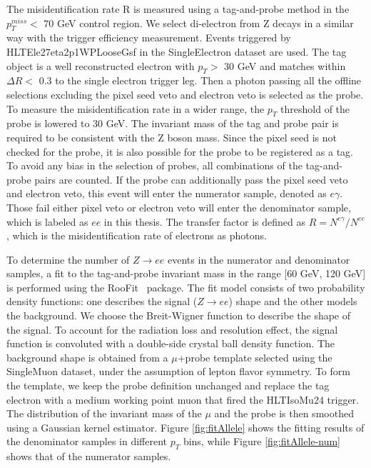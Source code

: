 \documentclass[thesis.tex]{subfiles}
\renewcommand\_{\textunderscore\allowbreak}
\begin{document}
The misidentification rate R is measured using a tag-and-probe method in the $p_T^{miss} < $ 70 GeV control region. We select di-electron from Z decays in a similar way with the trigger efficiency measurement. Events triggered by HLT\_Ele27\_eta2p1\_WPLoose\_Gsf in the SingleElectron dataset are used. The tag object is a well reconstructed electron with $p_T >$ 30 GeV and matches within $\Delta R <$ 0.3 to the single electron trigger leg. Then a photon passing all the offline selections excluding the pixel seed veto and electron veto is selected as the probe. To measure the misidentification rate in a wider range, the $p_T$ threshold of the probe is lowered to 30 GeV. The invariant mass of the tag and probe pair is required to be consistent with the Z boson mass. Since the pixel seed is not checked for the probe, it is also possible for the probe to be registered as a tag. To avoid any bias in the selection of probes, all combinations of the tag-and-probe pairs are counted. If the probe can additionally pass the pixel seed veto and electron veto, this event will enter the numerator sample, denoted as $e\gamma$. Those fail either pixel veto or electron veto will enter the denominator sample, which is labeled as $ee$ in this thesis. The transfer factor is defined as $R = N^{e\gamma}/N^{ee}$, which is the misidentification rate of electrons as photons.

To determine the number of $Z\rightarrow ee$ events in the numerator and denominator samples, a fit to the tag-and-probe invariant mass in the range [60 GeV, 120 GeV] is performed using the RooFit~\cite{RooFit} package. The fit model consists of two probability density functions: one describes the signal ($Z\rightarrow ee$) shape and the other models the background. We choose the Breit-Wigner function to describe the shape of the signal. To account for the radiation loss and resolution effect, the signal function is convoluted with a double-side crystal ball density function. The background shape is obtained from a $\mu$+probe template selected using the SingleMuon dataset, under the assumption of lepton flavor symmetry.  To form the template, we keep the probe definition unchanged and replace the tag electron with a medium working point muon that fired the HLT\_IsoMu24 trigger. The distribution of the invariant mass of the $\mu$ and the probe is then smoothed using a Gaussian kernel estimator. Figure \ref{fig:fitAllele} shows the fitting results of the denominator samples in different $p_T$ bins, while Figure \ref{fig:fitAllele-num} shows that of the numerator samples. 
\end{document}
